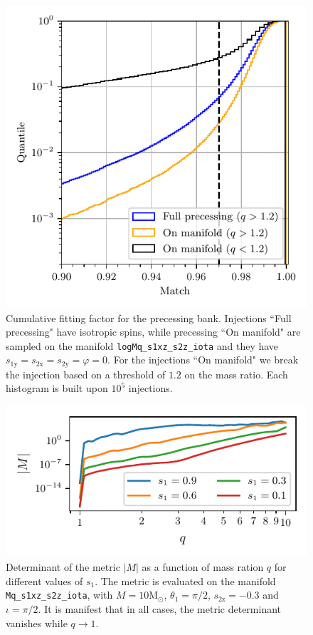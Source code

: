 \documentclass[twocolumn,showpacs,preprintnumbers,nofootinbib,prd,
superscriptaddress,10pt]{revtex4-2}
\begin{document}
\begin{figure}[t]
	\centering
	\includegraphics[scale = 1.]{precessing_hist}
	\caption{Cumulative fitting factor for the precessing bank. Injections ``Full precessing" have isotropic spins, while precessing ``On manifold" are sampled on the manifold \texttt{logMq\_s1xz\_s2z\_iota} and they have $s_\text{1y} = s_\text{2x} = s_\text{2y} = \varphi = 0$. For the injections ``On manifold" we break the injection based on a threshold of $1.2$ on the mass ratio. Each histogram is built upon $10^5$ injections.}
	\label{fig:precessing_hist}
\end{figure}


\begin{figure}[t]
	\centering
	\includegraphics[scale = 1.]{metric_det_vs_q}
	\caption{Determinant of the metric $|M|$ as a function of mass ration $q$ for different values of $s_1$. The metric is evaluated on the manifold \texttt{Mq\_s1xz\_s2z\_iota}, with $M = 10\mathrm{M_\odot}$, $\theta_1 = \pi/2$, $s_\text{2z} = -0.3$ and $\iota = \pi/2$. It is manifest that in all cases, the metric determinant vanishes while $q \to 1$.}
	\label{fig:metric_vs_q}
\end{figure}
\end{document}
